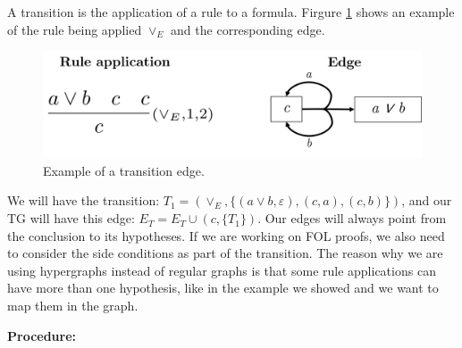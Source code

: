 \documentclass[runningheads]{llncs}
\begin{document}
A transition is the application of a rule to a formula. Firgure \ref{fig:te-ex} shows an example of the rule being applied \(\vee_E\) and the corresponding edge.

    \begin{figure}
        \centering
        \includegraphics[width=0.8\linewidth]{resources/te-example.jpg}
        \caption{Example of a transition edge.}
        \label{fig:te-ex}
    \end{figure}

We will have the transition: \(T_1 = (\vee_E, \{(a \vee b, \varepsilon), (c, a), (c, b)\})\), and our TG will have this edge: \(E_T = E_T \cup (c, \{T_1\})\). Our edges will always point from the conclusion to its hypotheses. If we are working on FOL proofs, we also need to consider the side conditions as part of the transition. The reason why we are using hypergraphs instead of regular graphs is that some rule applications can have more than one hypothesis, like in the example we showed and we want to map them in the graph.

\vspace{1em}
\textbf{Procedure: }
\end{document}
